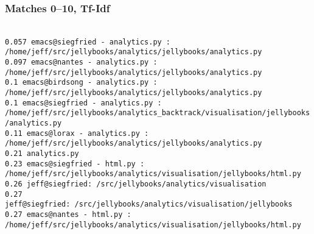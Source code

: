 \begin{frame}
  \frametitle{Matches 0--10, Tf-Idf}
  \tt\tiny
{}\\[2mm]
\hspace{2mm}0.057 emacs@siegfried - analytics.py : /home/jeff/src/jellybooks/analytics/jellybooks/analytics.py\\
\hspace{2mm}0.097 emacs@nantes - analytics.py : /home/jeff/src/jellybooks/analytics/jellybooks/analytics.py\\
\hspace{2mm}0.1 emacs@birdsong - analytics.py : /home/jeff/src/jellybooks/analytics/jellybooks/analytics.py\\
\hspace{2mm}0.1 emacs@siegfried - analytics.py : /home/jeff/src/jellybooks/analytics\_backtrack/visualisation/jellybooks/analytics.py\\
\hspace{2mm}0.11 emacs@lorax - analytics.py : /home/jeff/src/jellybooks/analytics/jellybooks/analytics.py\\
\hspace{2mm}0.21 analytics.py\\
\hspace{2mm}0.23 emacs@siegfried - html.py : /home/jeff/src/jellybooks/analytics/visualisation/jellybooks/html.py\\
\hspace{2mm}0.26 jeff@siegfried:~/src/jellybooks/analytics/visualisation\\
\hspace{2mm}0.27 jeff@siegfried:~/src/jellybooks/analytics/visualisation/jellybooks\\
\hspace{2mm}0.27 emacs@nantes - html.py : /home/jeff/src/jellybooks/analytics/visualisation/jellybooks/html.py
\end{frame}

